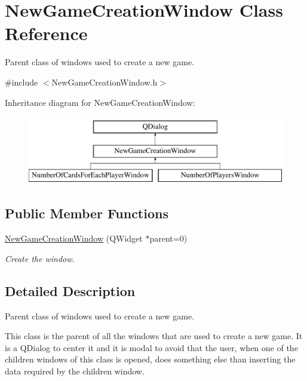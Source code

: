 \hypertarget{classNewGameCreationWindow}{}\section{New\+Game\+Creation\+Window Class Reference}
\label{classNewGameCreationWindow}


Parent class of windows used to create a new game.  




{\ttfamily \#include $<$New\+Game\+Creation\+Window.\+h$>$}

Inheritance diagram for New\+Game\+Creation\+Window\+:\begin{figure}[H]
\begin{center}
\leavevmode
\includegraphics[height=3.000000cm]{classNewGameCreationWindow}
\end{center}
\end{figure}
\subsection*{Public Member Functions}
\begin{DoxyCompactItemize}
\item 
\hyperlink{classNewGameCreationWindow_a1b8cd9166289a086a951c2ee9d6bfebe}{New\+Game\+Creation\+Window} (Q\+Widget $\ast$parent=0)
\begin{DoxyCompactList}\small\item\em Create the window. \end{DoxyCompactList}\end{DoxyCompactItemize}


\subsection{Detailed Description}
Parent class of windows used to create a new game. 

This class is the parent of all the windows that are used to create a new game. It is a Q\+Dialog to center it and it is modal to avoid that the user, when one of the children windows of this class is opened, does something else than inserting the data required by the children window. 

